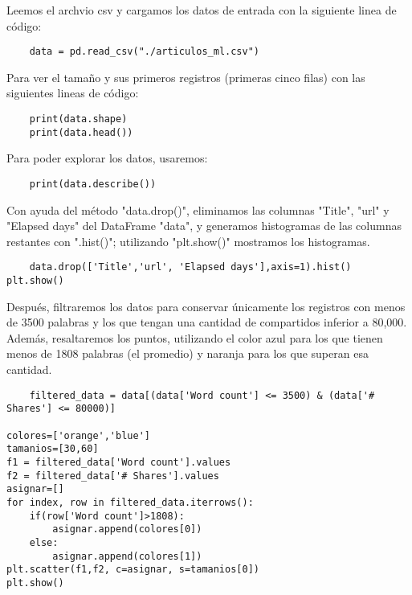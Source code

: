 \documentclass{pssbmac}
\begin{document}
\vspace{.3cm}
Leemos el archvio csv y cargamos los datos de entrada con la siguiente linea de código:
\begin{lstlisting}
    data = pd.read_csv("./articulos_ml.csv")
\end{lstlisting}

\vspace{.2cm}
Para ver el tamaño y sus primeros registros (primeras cinco filas) con las siguientes lineas de código:
\begin{lstlisting}
    print(data.shape)
    print(data.head())
\end{lstlisting}
Para poder explorar los datos, usaremos: 
\begin{lstlisting}
    print(data.describe())
\end{lstlisting}
Con ayuda del método "data.drop()", eliminamos las columnas "Title", "url" y "Elapsed days" del DataFrame "data", y generamos histogramas de las columnas restantes con ".hist()"; utilizando "plt.show()" mostramos los histogramas.
\begin{lstlisting}
    data.drop(['Title','url', 'Elapsed days'],axis=1).hist()
plt.show()
\end{lstlisting}

Después, filtraremos los datos para conservar únicamente los registros con menos de 3500 palabras y los que tengan una cantidad de compartidos inferior a 80,000. Además, resaltaremos los puntos, utilizando el color azul para los que tienen menos de 1808 palabras (el promedio) y naranja para los que superan esa cantidad.
\begin{lstlisting}
    filtered_data = data[(data['Word count'] <= 3500) & (data['# Shares'] <= 80000)]

colores=['orange','blue']
tamanios=[30,60]
f1 = filtered_data['Word count'].values
f2 = filtered_data['# Shares'].values
asignar=[]
for index, row in filtered_data.iterrows():
    if(row['Word count']>1808):
        asignar.append(colores[0])
    else:
        asignar.append(colores[1])
plt.scatter(f1,f2, c=asignar, s=tamanios[0])
plt.show()
\end{lstlisting}
\end{document}
